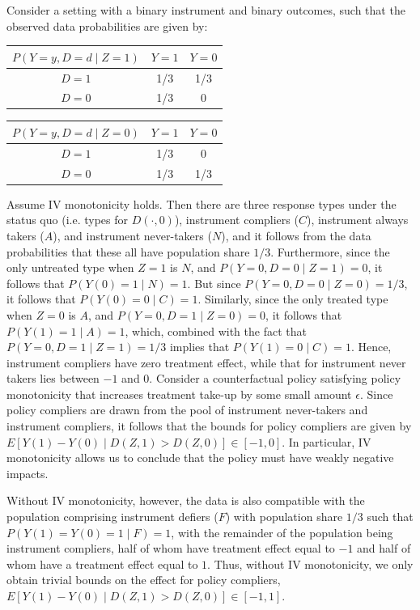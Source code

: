 \documentclass[12pt]{article}%
\theoremstyle{definition}
\newcommand\1{\operatorname{I}\indicatorfence}
\begin{document}
\begin{appendices}
Consider a setting with a binary instrument and binary outcomes, such that the observed data probabilities are given by:\\
  \begin{tabular}{@{}c|cc@{}}
    $P(Y=y, D=d\mid Z=1)$ & {$Y=1$} & {$Y=0$} \\
    \midrule
    $D=1$ & 1/3 & 1/3 \\
    $D=0$ & 1/3 & 0
  \end{tabular}\hspace{1ex}
  \begin{tabular}{@{}c|cc@{}}
    $P(Y=y, D=d\mid Z=0)$ & {$Y=1$} & {$Y=0$} \\
    \midrule
    $D=1$ & 1/3 & 0 \\
    $D=0$ & 1/3 & 1/3
  \end{tabular}

Assume IV monotonicity holds. Then there are three response types under the status quo  (i.e. types for $D(\cdot,0)$), instrument
compliers ($C$), instrument always takers ($A$), and instrument never-takers
($N$), and it follows from the data probabilities that these all have population
share $1/3$. Furthermore, since the only untreated type when $Z=1$ is $N$, and
$P(Y=0, D=0\mid Z=1)=0$, it follows that $P(Y(0)=1\mid N)=1$. But since $P(Y=0, D=0\mid Z=0)=1/3$, it follows that $P(Y(0)=0\mid C)=1$. Similarly,
since the only treated type when $Z=0$ is $A$, and $P(Y=0, D=1\mid Z=0)=0$, it
follows that $P(Y(1)=1\mid A)=1$, which, combined with the fact that $P(Y=0, D=1\mid Z=1)=1/3$ implies that $P(Y(1)=0\mid C)=1$. Hence, instrument compliers have zero treatment
effect, while that for instrument never takers lies between $-1$ and $0$. Consider a counterfactual policy satisfying policy monotonicity that increases treatment take-up by some small amount $\epsilon$. Since policy compliers are drawn from the pool of instrument never-takers and instrument compliers, it follows that the bounds for policy compliers are given by $E[Y(1)-Y(0)\mid D(Z,1)>D(Z,0)]\in [-1,0]$. In particular, IV monotonicity allows us to conclude that the policy must have weakly negative impacts.

Without IV monotonicity, however, the data is also compatible with the
population comprising instrument defiers ($F$) with population share $1/3$ such
that $P(Y(1)=Y(0)=1\mid F)=1$, with the remainder of the population being
instrument compliers, half of whom have treatment effect equal to $-1$ and half
of whom have a treatment effect equal to $1$. Thus, without IV monotonicity, we
only obtain trivial bounds on the effect for policy compliers, $E[Y(1)-Y(0)\mid
D(Z,1)>D(Z,0)]\in [-1, 1]$.


\end{appendices}
\end{document}
